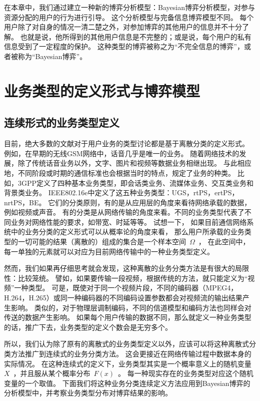 在本章中，我们通过建立一种新的博弈分析模型：Bayesian博弈分析模型，对参与资源分配的用户的行为进行引导。
这个分析模型与完备信息博弈模型不同。
每个用户除了对自身的情况一清二楚之外，对参加博弈的其他用户的信息并不十分了解。
也就是说，他所得到的其他用户信息是不完整的；或是说，每个用户的私有信息受到了一定程度的保护。
这种类型的博弈被称之为“不完全信息的博弈”，或者被称为“Bayesian博弈”。


\section{业务类型的定义形式与博弈模型}
\subsection{连续形式的业务类型定义}
目前，绝大多数的文献对于用户业务的类型讨论都是基于离散分类的定义形式。
例如，在早期的无线GSM网络中，话音几乎是唯一的业务。
随着网络技术的发展，除了传统话音业务以外，文字、图片和视频等数据业务相继出现。
与此相应地，不同阶段或时期的通信标准也会根据当时的特点，规定了业务的种类。
比如，3GPP定义了四种基本业务类型，即会话类业务、流媒体业务、交互类业务和背景类业务。
IEEE802.16e中定义了这五种业务类型：UGS，rtPS，ertPS，nrtPS，BE。
它们的分类原则，有的是从应用层的角度来看待网络承载的数据，例如视频或声音。
有的分类是从网络传输的角度来看。不同的业务类型代表了不同业务对网络性能的要求，如带宽、时延等等。
试想一下，
如果目前通信网络系统中的业务分类的定义形式可以从概率论的角度来看，
那么用户所承载的业务类型的一切可能的结果（离散的）组成的集合是一个样本空间~$\Omega$~，
在此空间中，每一单独的元素就可以对应为目前网络传输中的一种业务类型定义。

然而，我们如果再仔细思考就会发现，这种离散的业务分类方法是有很大的局限性：比较笼统。
譬如，如果要传输一段视频，根据传统的方法，就只能定义为“视频”一种类型。 可是，既使对于同一个视频片段，不同的编码器（MPEG4，H.264，H.265）或同一种编码器的不同编码设置参数都会对视频流的输出结果产生影响。
类似的，对于物理层调制编码，不同的信道模型和编码方法也同样会对传送的数据产生影响。
如果每个用户传输的数据不同，那么就定义一种业务类型的话，推广下去，业务类型的定义个数会是无穷多个。

所以，我们认为除了原有的离散式的业务类型定义以外，应该可以将这种离散式分类方法推广到连续式的业务分类方法。
这会更接近在网络传输过程中数据本身的实际情况。
在这种连续式的定义下，业务类型其实是一个概率意义上的随机变量~$X$~，并且服从某个概率分布~$F(x)$~。
每一种现实存在的业务类型对应这个随机变量的一个取值。
下面我们将这种业务分类连续定义方法应用到Bayesian博弈的分析模型中，并考察业务类型分布对博弈结果的影响。

